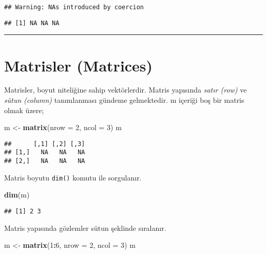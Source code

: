 \documentclass[
]{book}
\newenvironment{Shaded}{\begin{snugshade}}{\end{snugshade}}
\newcommand{\DataTypeTok}[1]{\textcolor[rgb]{0.13,0.29,0.53}{#1}}
\newcommand{\DecValTok}[1]{\textcolor[rgb]{0.00,0.00,0.81}{#1}}
\newcommand{\KeywordTok}[1]{\textcolor[rgb]{0.13,0.29,0.53}{\textbf{#1}}}
\newcommand{\NormalTok}[1]{#1}
\newcommand{\OperatorTok}[1]{\textcolor[rgb]{0.81,0.36,0.00}{\textbf{#1}}}
\newcommand{\StringTok}[1]{\textcolor[rgb]{0.31,0.60,0.02}{#1}}
\begin{document}
\begin{verbatim}
## Warning: NAs introduced by coercion
\end{verbatim}

\begin{verbatim}
## [1] NA NA NA
\end{verbatim}

\begin{center}\rule{0.5\linewidth}{0.5pt}\end{center}

\hypertarget{matrisler-matrices}{%
\section{Matrisler (Matrices)}\label{matrisler-matrices}}

Matrisler, boyut niteliğine sahip vektörlerdir. Matris yapısında \emph{satır (row)} ve \emph{sütun (column)} tanımlanması gündeme gelmektedir. m içeriği boş bir matris olmak üzere;

\begin{Shaded}
\begin{Highlighting}[]
\NormalTok{m <-}\StringTok{ }\KeywordTok{matrix}\NormalTok{(}\DataTypeTok{nrow =} \DecValTok{2}\NormalTok{, }\DataTypeTok{ncol =} \DecValTok{3}\NormalTok{)}
\NormalTok{m}
\end{Highlighting}
\end{Shaded}

\begin{verbatim}
##      [,1] [,2] [,3]
## [1,]   NA   NA   NA
## [2,]   NA   NA   NA
\end{verbatim}

Matris boyutu \texttt{dim()} komutu ile sorgulanır.

\begin{Shaded}
\begin{Highlighting}[]
\KeywordTok{dim}\NormalTok{(m)}
\end{Highlighting}
\end{Shaded}

\begin{verbatim}
## [1] 2 3
\end{verbatim}

Matris yapısında gözlemler sütun şeklinde sıralanır.

\begin{Shaded}
\begin{Highlighting}[]
\NormalTok{m <-}\StringTok{ }\KeywordTok{matrix}\NormalTok{(}\DecValTok{1}\OperatorTok{:}\DecValTok{6}\NormalTok{, }\DataTypeTok{nrow =} \DecValTok{2}\NormalTok{, }\DataTypeTok{ncol =} \DecValTok{3}\NormalTok{) }
\NormalTok{m}
\end{Highlighting}
\end{Shaded}
\end{document}
